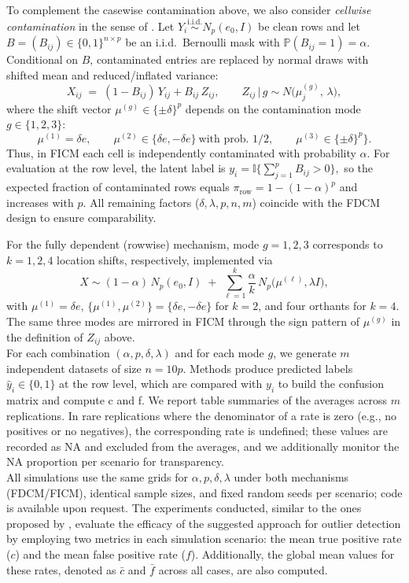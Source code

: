 \documentclass[12pt]{article}
\begin{document}
To complement the casewise contamination above, we also consider \textit{cellwise contamination} in the sense of \citet{Alqallaf2009}. Let \(Y_i \stackrel{\text{i.i.d.}}{\sim} N_p(e_0,I)\) be clean rows and let \(B=(B_{ij})\in\{0,1\}^{n\times p}\) be an i.i.d.\ Bernoulli mask with \(\mathbb{P}(B_{ij}=1)=\alpha\). Conditional on \(B\), contaminated entries are replaced by normal draws with shifted mean and reduced/inflated variance:
\[
X_{ij} \;=\; (1-B_{ij})\,Y_{ij} + B_{ij}\,Z_{ij}, 
\qquad
Z_{ij}\,\big|\,g \sim N\!\big(\mu^{(g)}_{j},\,\lambda\big),
\]
where the shift vector \(\mu^{(g)}\in\{\pm \delta\}^p\) depends on the contamination mode \(g\in\{1,2,3\}\):
\[
\mu^{(1)}=\delta e
,\qquad
\mu^{(2)}\in\{\delta e,-\delta e\}\ \text{with prob.\ }1/2
,\qquad
\mu^{(3)}\in\{\pm\delta\}^p\}.
\]
Thus, in FICM each cell is independently contaminated with probability \(\alpha\). For evaluation at the row level, the latent label is
\(
y_i=\mathbb{I}\{\sum_{j=1}^p B_{ij}>0\},
\)
so the expected fraction of contaminated rows equals
\(
\pi_{\text{row}}=1-(1-\alpha)^p
\)
and increases with \(p\). All remaining factors (\(\delta,\lambda,p,n,m\)) coincide with the FDCM design to ensure comparability.


For the fully dependent (rowwise) mechanism, mode \(g=1,2,3\) corresponds to \(k=1,2,4\) location shifts, respectively, implemented via
\[
X \sim (1-\alpha)\,N_p(e_0,I)\;+\;\sum_{\ell=1}^{k}\frac{\alpha}{k}\,N_p\!\big(\mu^{(\ell)},\lambda I\big),
\]
with \(\mu^{(1)}=\delta e\), \(\{\mu^{(1)},\mu^{(2)}\}=\{\delta e,-\delta e\}\) for \(k=2\), and four orthants for \(k=4\). The same three modes are mirrored in FICM through the sign pattern of \(\mu^{(g)}\) in the definition of \(Z_{ij}\) above.\\


For each combination \((\alpha,p,\delta,\lambda)\) and for each mode \(g\), we generate \(m\) independent datasets of size \(n=10p\). Methods produce predicted labels \(\hat y_i\in\{0,1\}\) at the row level, which are compared with \(y_i\) to build the confusion matrix and compute c and f. We report table summaries of the averages across \(m\) replications. In rare replications where the denominator of a rate is zero (e.g., no positives or no negatives), the corresponding rate is undefined; these values are recorded as NA and excluded from the averages, and we additionally monitor the NA proportion per scenario for transparency.\\


All simulations use the same grids for \(\alpha,p,\delta,\lambda\) under both mechanisms (FDCM/FICM), identical sample sizes, and fixed random seeds per scenario; code is available upon request. The experiments conducted, similar to the ones proposed by \citep{PeñaPrieto2007}, evaluate the efficacy of the suggested approach for outlier detection by employing two metrics in each simulation scenario: the mean true positive rate (\({c}\)) and the mean false positive rate (\({f}\)). Additionally, the global mean values for these rates, denoted as \(\bar{c}\) and \(\bar{f}\) across all cases, are also computed.
\end{document}

